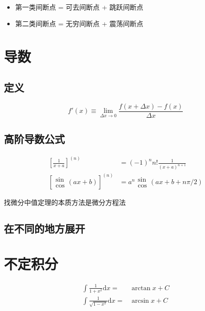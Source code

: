\documentclass{article}
\begin{document}
\begin{itemize}
    \item 第一类间断点 = 可去间断点 + 跳跃间断点
    \item 第二类间断点 = 无穷间断点 + 震荡间断点
\end{itemize}

\section{导数}

\subsection{定义}

\begin{equation}
    f'(x) \equiv \lim_{\Delta x \to 0} \frac{f(x + \Delta x) - f(x)}{\Delta x}
\end{equation}

\subsection{高阶导数公式}

\begin{align}
    \left[\frac{1}{x + a}\right]^{(n)}   & = (-1)^n n! \frac{1}{(x + a)^{n+1}}             \\
    \left[\begin{aligned}
                  \sin \\ \cos
              \end{aligned} (a x + b)\right]^{(n)} & = a^n \begin{aligned}
                                                           \sin \\ \cos
                                                       \end{aligned} (a x + b + n \pi / 2)
\end{align}

找微分中值定理的本质方法是微分方程法

\subsection{在不同的地方展开}

\section{不定积分}

\begin{align}
    \int \frac{1}{1 + x^2} \mathrm{d}x =        & \arctan x + C \\
    \int \frac{1}{\sqrt{1 - x^2}} \mathrm{d}x = & \arcsin x + C
\end{align}
\end{document}
